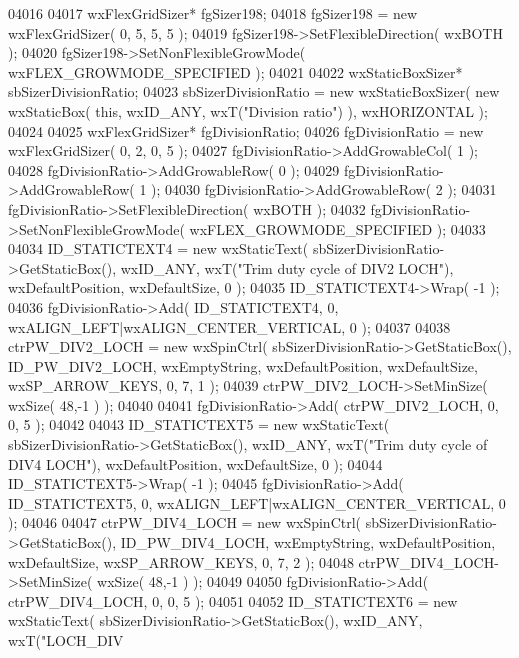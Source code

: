 \begin{DoxyCode}
04016     
04017     wxFlexGridSizer* fgSizer198;
04018     fgSizer198 = \textcolor{keyword}{new} wxFlexGridSizer( 0, 5, 5, 5 );
04019     fgSizer198->SetFlexibleDirection( wxBOTH );
04020     fgSizer198->SetNonFlexibleGrowMode( wxFLEX\_GROWMODE\_SPECIFIED );
04021     
04022     wxStaticBoxSizer* sbSizerDivisionRatio;
04023     sbSizerDivisionRatio = \textcolor{keyword}{new} wxStaticBoxSizer( \textcolor{keyword}{new} wxStaticBox( \textcolor{keyword}{this}, wxID\_ANY, wxT(\textcolor{stringliteral}{"Division ratio"}) ), 
      wxHORIZONTAL );
04024     
04025     wxFlexGridSizer* fgDivisionRatio;
04026     fgDivisionRatio = \textcolor{keyword}{new} wxFlexGridSizer( 0, 2, 0, 5 );
04027     fgDivisionRatio->AddGrowableCol( 1 );
04028     fgDivisionRatio->AddGrowableRow( 0 );
04029     fgDivisionRatio->AddGrowableRow( 1 );
04030     fgDivisionRatio->AddGrowableRow( 2 );
04031     fgDivisionRatio->SetFlexibleDirection( wxBOTH );
04032     fgDivisionRatio->SetNonFlexibleGrowMode( wxFLEX\_GROWMODE\_SPECIFIED );
04033     
04034     ID_STATICTEXT4 = \textcolor{keyword}{new} wxStaticText( sbSizerDivisionRatio->GetStaticBox(), wxID\_ANY, wxT(\textcolor{stringliteral}{"Trim duty cycle
       of DIV2 LOCH"}), wxDefaultPosition, wxDefaultSize, 0 );
04035     ID_STATICTEXT4->Wrap( -1 );
04036     fgDivisionRatio->Add( ID_STATICTEXT4, 0, wxALIGN\_LEFT|wxALIGN\_CENTER\_VERTICAL, 0 );
04037     
04038     ctrPW_DIV2_LOCH = \textcolor{keyword}{new} wxSpinCtrl( sbSizerDivisionRatio->GetStaticBox(), 
      ID_PW_DIV2_LOCH, wxEmptyString, wxDefaultPosition, wxDefaultSize, wxSP\_ARROW\_KEYS, 0, 7, 1 );
04039     ctrPW_DIV2_LOCH->SetMinSize( wxSize( 48,-1 ) );
04040     
04041     fgDivisionRatio->Add( ctrPW_DIV2_LOCH, 0, 0, 5 );
04042     
04043     ID_STATICTEXT5 = \textcolor{keyword}{new} wxStaticText( sbSizerDivisionRatio->GetStaticBox(), wxID\_ANY, wxT(\textcolor{stringliteral}{"Trim duty cycle
       of DIV4 LOCH"}), wxDefaultPosition, wxDefaultSize, 0 );
04044     ID_STATICTEXT5->Wrap( -1 );
04045     fgDivisionRatio->Add( ID_STATICTEXT5, 0, wxALIGN\_LEFT|wxALIGN\_CENTER\_VERTICAL, 0 );
04046     
04047     ctrPW_DIV4_LOCH = \textcolor{keyword}{new} wxSpinCtrl( sbSizerDivisionRatio->GetStaticBox(), 
      ID_PW_DIV4_LOCH, wxEmptyString, wxDefaultPosition, wxDefaultSize, wxSP\_ARROW\_KEYS, 0, 7, 2 );
04048     ctrPW_DIV4_LOCH->SetMinSize( wxSize( 48,-1 ) );
04049     
04050     fgDivisionRatio->Add( ctrPW_DIV4_LOCH, 0, 0, 5 );
04051     
04052     ID_STATICTEXT6 = \textcolor{keyword}{new} wxStaticText( sbSizerDivisionRatio->GetStaticBox(), wxID\_ANY, wxT(\textcolor{stringliteral}{"LOCH\_DIV
}
\end{DoxyCode}

